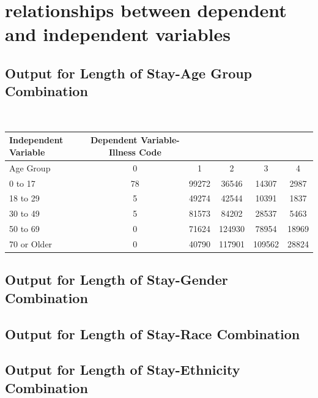 \documentclass[
	letterpaper, %
]{jdf}
\begin{document}
\break
\section{relationships between dependent and independent variables}
\subsection{Output for Length of Stay-Age Group Combination}
\ 
\begin{jdftable}
\label{table:Example}
\small %
\begin{tabular}{@{} l c c c c c}
\textbf{Independent Variable} & \textbf{Dependent Variable-Illness Code} & & & & \\
	\toprule[0.5pt]
	Age Group & 0 & 1 & 2 & 3 & 4\\
	\midrule
	0 to 17 & 78 & 99272 & 36546 & 14307 & 2987 \\
 \midrule
 18 to 29 & 5 & 49274 & 42544 & 10391 & 1837 \\
 \midrule
 30 to 49 & 5 & 81573 & 84202 & 28537 & 5463 \\
 \midrule
 50 to 69 & 0 & 71624 & 124930 & 78954 & 18969 \\
 \midrule
 70 or Older & 0 & 40790 & 117901 & 109562 & 28824 \\
\end{tabular}
\end{jdftable}

\subsection{Output for Length of Stay-Gender Combination}
\subsection{Output for Length of Stay-Race Combination}
\subsection{Output for Length of Stay-Ethnicity Combination}
\end{document}
